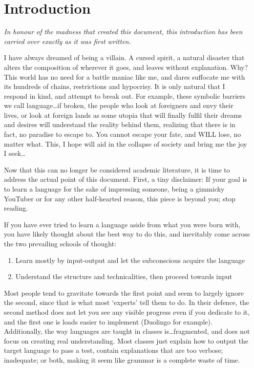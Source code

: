 \part{Introduction} \label{part:int}
\textit{In honour of the madness that created this document, this introduction has been carried over exactly as it was first written.}

I have always dreamed of being a villain. A cursed spirit, a natural disaster that alters the composition of wherever it goes, and leaves without explanation. Why? This world has no need for a battle maniac like me, and dares suffocate me with its hundreds of chains, restrictions and hypocrisy. It is only natural that I respond in kind, and attempt to break out. For example, these symbolic barriers we call language\ldots if broken, the people who look at foreigners and envy their lives, or look at foreign lands as some utopia that will finally fulfil their dreams and desires will understand the reality behind them, realizing that there is in fact, no paradise to escape to. You cannot escape your fate, and WILL lose, no matter what. This, I hope will aid in the collapse of society and bring me the joy I seek\ldots

Now that this can no longer be considered academic literature, it is time to address the actual point of this document. First, a tiny disclaimer: If your goal is to learn a language for the sake of impressing someone, being a gimmicky YouTuber or for any other half-hearted reason, this piece is beyond you; stop reading. 

If you have ever tried to learn a language aside from what you were born with, you have likely thought about  the best way to do this, and inevitably come across the two prevailing schools of thought:
\begin{enumerate}
    \item Learn mostly by input-output and let the subconscious acquire the language
    \item Understand the structure and technicalities, then proceed towards input
\end{enumerate}
Most people tend to gravitate towards the first point and seem to largely ignore the second, since that is what most `experts' tell them to do. In their defence, the second method does not let you see any visible progress even if you dedicate to it, and the first one is loads easier to implement (Duolingo for example). Additionally,  the way languages are taught in  classes is\ldots fragmented, and does not focus on creating real understanding. Most classes just explain how to output  the target language to pass a test,  contain explanations that are too verbose; inadequate; or both, making it seem like grammar is a complete waste of time. 

